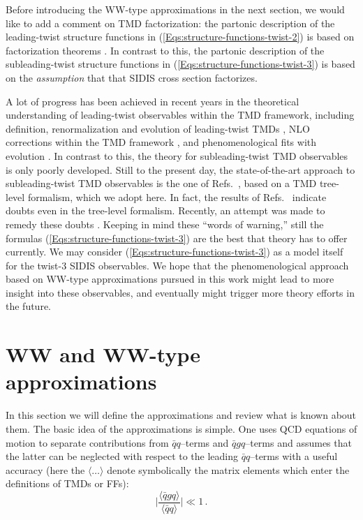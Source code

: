 \documentclass[a4paper,11pt]{article}
\newcommand{\be}{\begin{equation}}
\newcommand{\ee}{\end{equation}}
\newcommand{\la}{\langle}
\newcommand{\ra}{\rangle}
\begin{document}
Before introducing the WW-type approximations in the next section, 
we would like to add a comment on TMD factorization: the 
partonic description of the leading-twist structure functions in 
(\ref{Eqs:structure-functions-twist-2}) is based on factorization 
theorems \cite{Collins:1981uk,Ji:2004wu,Ji:2004xq,Collins:2011zzd,
Echevarria:2012js}. In contrast to this, the partonic description 
of the subleading-twist structure functions in 
(\ref{Eqs:structure-functions-twist-3}) is based on the
{\it assumption} that that SIDIS cross section factorizes.

A lot of progress has been achieved in recent years in the 
theoretical understanding of leading-twist observables within the TMD 
framework, including definition, renormalization and evolution of 
leading-twist TMDs \cite{Aybat:2011zv,Aybat:2011ge,Echevarria:2014xaa},
NLO corrections within the TMD framework \cite{Ma:2013aca}, and  
phenomenological fits with evolution \cite{Aybat:2011ta,Kang:2015msa}.
In contrast to this, the theory for subleading-twist TMD observables is 
only poorly developed. Still to the present day, the state-of-the-art 
approach to subleading-twist TMD observables is the one of 
Refs.~\cite{Kotzinian:1994dv,Mulders:1995dh,Boer:1997nt,Goeke:2005hb,
Bacchetta:2006tn}, 
based on a TMD tree-level formalism, which we adopt here.
In fact, the results of Refs.~\cite{Metz:2004je,Gamberg:2006ru}
indicate doubts even in the tree-level formalism. 
Recently, an attempt was made to remedy these doubts \cite{Chen:2016hgw}.
Keeping in mind these ``words of warning,'' still the formulas 
(\ref{Eqs:structure-functions-twist-3}) 
are the best that theory has to offer currently. We may consider 
(\ref{Eqs:structure-functions-twist-3}) as a model itself for 
the twist-3 SIDIS observables. We hope that the phenomenological 
approach based on WW-type approximations pursued in this work might 
lead to more insight into these observables, and eventually might 
trigger more theory efforts in the future.

%
\section{WW and WW-type approximations}
\label{Sec-3:WW}

In this section we will define the approximations and review what is
known about them.
The basic idea of the approximations is simple. One uses QCD
equations of motion to separate contributions from $\bar{q}q$--terms 
and $\bar{q}gq$--terms and assumes that the latter can be neglected 
with respect to the leading $\bar{q}q$--terms with a useful accuracy
(here the $\la\dots\ra$ denote symbolically the matrix elements 
which enter the definitions of TMDs or FFs):
\be\label{Eq:WW-generic}
	\biggl|\frac{\la\bar{q}gq\ra}{\la\bar{q}q\ra}\biggr| \ll 1\,.
\ee
\end{document}
